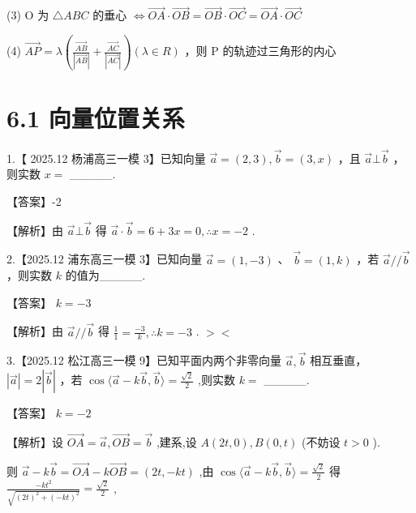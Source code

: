 \documentclass[10pt]{article}
\begin{document}
(3) \(\mathrm{O}\) 为 \(\bigtriangleup {ABC}\) 的垂心 \(\Leftrightarrow  \overrightarrow{OA} \cdot  \overrightarrow{OB} = \overrightarrow{OB} \cdot  \overrightarrow{OC} = \overrightarrow{OA} \cdot  \overrightarrow{OC}\)

(4) \(\overrightarrow{AP} = \lambda \left( {\frac{\overrightarrow{AB}}{\left| \overrightarrow{AB}\right| } + \frac{\overrightarrow{AC}}{\left| \overrightarrow{AC}\right| }}\right) \left( {\lambda  \in  R}\right)\) ，则 \(\mathrm{P}\) 的轨迹过三角形的内心

\section*{6.1 向量位置关系}

1.【 2025.12 杨浦高三一模 3】已知向量 \(\overrightarrow{a} = \left( {2,3}\right) ,\overrightarrow{b} = \left( {3,x}\right)\) ，且 \(\overrightarrow{a}\bot \overrightarrow{b}\) ，则实数 \(x =\) \_\_\_\_\_.

【答案】-2

【解析】由 \(\overrightarrow{a} \bot  \overrightarrow{b}\) 得 \(\overrightarrow{a} \cdot  \overrightarrow{b} = 6 + {3x} = 0,\therefore x =  - 2\) .

2.【2025.12 浦东高三一模 3】已知向量 \(\overrightarrow{a} = \left( {1, - 3}\right)\) 、 \(\overrightarrow{b} = \left( {1,k}\right)\) ，若 \(\overrightarrow{a}//\overrightarrow{b}\) ，则实数 \(k\) 的值为\_\_\_\_\_.

【答案】 \(k =  - 3\)

【解析】由 \(\overrightarrow{a}//\overrightarrow{b}\) 得 \(\frac{1}{1} = \frac{-3}{k},\therefore k =  - 3\) . \(>  <\)

3.【2025.12 松江高三一模 9】已知平面内两个非零向量 \(\overrightarrow{a},\overrightarrow{b}\) 相互垂直， \(\left| \overrightarrow{a}\right|  = 2\left| \overrightarrow{b}\right|\) ，若 \(\cos \langle \overrightarrow{a} - k\overrightarrow{b},\overrightarrow{b}\rangle  = \frac{\sqrt{2}}{2}\) ,则实数 \(k =\) \_\_\_\_\_.

【答案】 \(k =  - 2\)

【解析】设 \(\overrightarrow{OA} = \overrightarrow{a},\overrightarrow{OB} = \overrightarrow{b}\) ,建系,设 \(A\left( {{2t},0}\right) ,B\left( {0,t}\right)\) (不妨设 \(t > 0\) ).

则 \(\overrightarrow{a} - k\overrightarrow{b} = \overrightarrow{OA} - k\overrightarrow{OB} = \left( {{2t}, - {kt}}\right)\) ,由 \(\cos \langle \overrightarrow{a} - k\overrightarrow{b},\overrightarrow{b}\rangle  = \frac{\sqrt{2}}{2}\) 得 \(\frac{-k{t}^{2}}{\sqrt{{\left( 2t\right) }^{2} + {\left( -kt\right) }^{2}}} = \frac{\sqrt{2}}{2}\) ,
\end{document}
